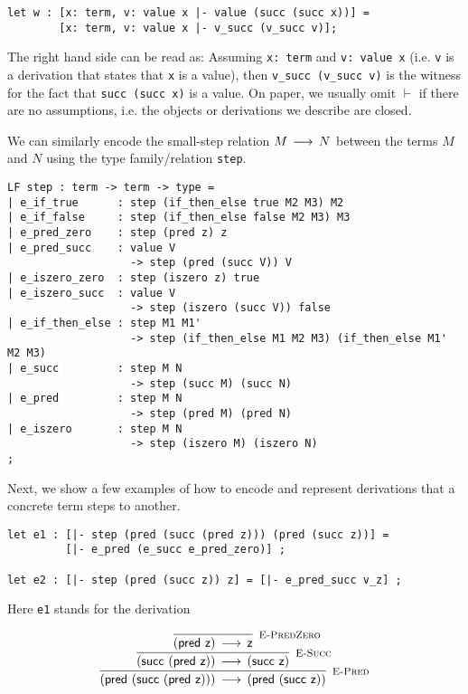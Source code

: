 \begin{lstlisting}
let w : [x: term, v: value x |- value (succ (succ x))] =
        [x: term, v: value x |- v_succ (v_succ v)];
\end{lstlisting}

The right hand side can be read as: Assuming \lstinline!x: term! and
\lstinline!v: value x! (i.e. \lstinline!v! is a derivation that states that
\lstinline!x! is a value), then \lstinline!v_succ (v_succ v)! is the witness for
the fact that \lstinline!succ (succ x)! is a value. On paper, we usually omit
$\vdash$ if there are no assumptions, i.e. the objects or derivations we
describe are closed.

We can similarly encode the small-step relation $M \mathrel{\,\longrightarrow\,} N$  between the terms
$M$ and $N$ using the type family/relation \lstinline!step!.

\begin{lstlisting}
LF step : term -> term -> type =
| e_if_true      : step (if_then_else true M2 M3) M2
| e_if_false     : step (if_then_else false M2 M3) M3
| e_pred_zero    : step (pred z) z
| e_pred_succ    : value V
                   -> step (pred (succ V)) V
| e_iszero_zero  : step (iszero z) true
| e_iszero_succ  : value V
                   -> step (iszero (succ V)) false
| e_if_then_else : step M1 M1'
                   -> step (if_then_else M1 M2 M3) (if_then_else M1' M2 M3)
| e_succ         : step M N
                   -> step (succ M) (succ N)
| e_pred         : step M N
                   -> step (pred M) (pred N)
| e_iszero       : step M N
                   -> step (iszero M) (iszero N)
;
\end{lstlisting}

Next, we show a few examples of how to encode and represent derivations that a
concrete term steps to another.

\begin{lstlisting}
let e1 : [|- step (pred (succ (pred z))) (pred (succ z))] =
         [|- e_pred (e_succ e_pred_zero)] ;

let e2 : [|- step (pred (succ z)) z] = [|- e_pred_succ v_z] ;
\end{lstlisting}

Here \lstinline!e1! stands for the derivation

\[
\begin{array}{c}
\infer[\EPred]{(\tmpred {(\tmsucc {(\tmpred {\tmzero})})}) \Steps (\tmpred {(\tmsucc {\tmzero})})}
{\infer[\ESucc]{(\tmsucc {(\tmpred {\tmzero})}) \Steps (\tmsucc {\tmzero} )}
 {\infer[\EPredZ]{(\tmpred {\tmzero}) \Steps \tmzero}{}}
}
\end{array}
\]

